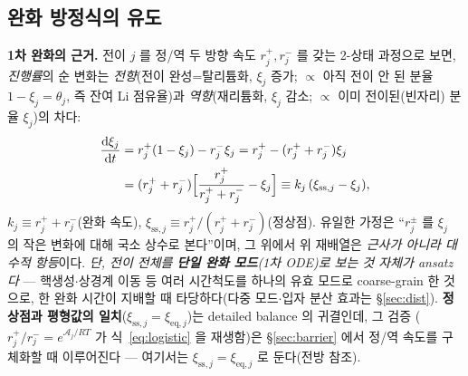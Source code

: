 \documentclass[11pt,a4paper]{article}
\newcommand{\dd}{\mathrm{d}}
\newcommand{\eq}{\mathrm{eq}}
\newcommand{\sstat}{\mathrm{ss}}
\begin{document}
\subsection{완화 방정식의 유도}
\textbf{1차 완화의 근거.} 전이 $j$ 를 정/역 두 방향 속도 $r_j^+,r_j^-$ 를 갖는 2-상태 과정으로 보면, \emph{진행률}의
순 변화는 \emph{전향}(전이 완성=탈리튬화, $\xi_j$ 증가; $\propto$ 아직 전이 안 된 분율 $1-\xi_j=\theta_j$, 즉 잔여 Li
점유율)과 \emph{역향}(재리튬화, $\xi_j$ 감소; $\propto$ 이미 전이된(빈자리) 분율 $\xi_j$)의 차다:
\begin{align}
\frac{\dd\xi_j}{\dd t}&=r_j^+(1-\xi_j)-r_j^-\xi_j
=r_j^+-(r_j^++r_j^-)\xi_j\notag\\
&=(r_j^++r_j^-)\Big[\frac{r_j^+}{r_j^++r_j^-}-\xi_j\Big]
\equiv k_j\,(\xi_{\sstat,j}-\xi_j),
\label{eq:relax}
\end{align}
$k_j\equiv r_j^++r_j^-$(완화 속도), $\xi_{\sstat,j}\equiv r_j^+/(r_j^++r_j^-)$(정상점). 유일한 가정은 ``$r_j^\pm$ 를
$\xi_j$ 의 작은 변화에 대해 국소 상수로 본다''이며, 그 위에서 위 재배열은 \emph{근사가 아니라 대수적 항등}이다.
\emph{단, 전이 전체를 \textbf{단일 완화 모드}(1차 ODE)로 보는 것 자체가 ansatz 다} — 핵생성$\cdot$상경계 이동 등
여러 시간척도를 하나의 유효 모드로 coarse-grain 한 것으로, 한 완화 시간이 지배할 때 타당하다(다중 모드$\cdot$입자
분산 효과는 \S\ref{sec:dist}).
\textbf{정상점과 평형값의 일치}($\xi_{\sstat,j}=\xi_{\eq,j}$)는 detailed balance 의 귀결인데, 그 검증
($r_j^+/r_j^-=e^{\mathcal A_j/RT}$ 가 식~\eqref{eq:logistic} 을 재생함)은 \S\ref{sec:barrier} 에서 정/역 속도를
구체화할 때 이루어진다 — 여기서는 $\xi_{\sstat,j}=\xi_{\eq,j}$ 로 둔다(전방 참조).
\end{document}
